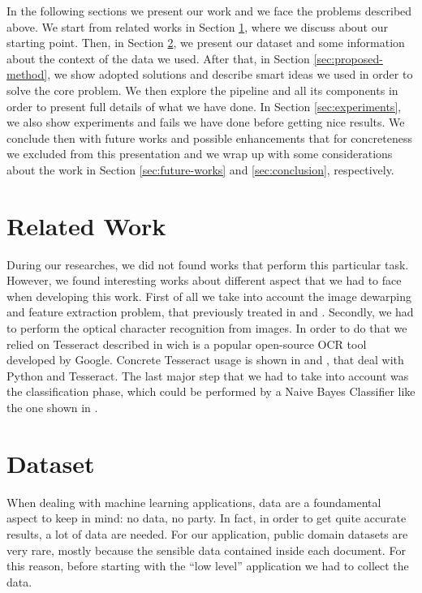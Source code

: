 \documentclass[10pt,twocolumn,letterpaper]{article}
\begin{document}
In the following sections we present our work and we face the problems
described above. We start from related works in Section
\ref{sec:related-work}, where we discuss about our starting
point. Then, in Section \ref{sec:dataset}, we present our dataset and
some information about the context of the data we used. After that, in
Section \ref{sec:proposed-method}, we show adopted solutions and
describe smart ideas we used in order to solve the core problem. We
then explore the pipeline and all its components in order to present
full details of what we have done. In Section \ref{sec:experiments},
we also show experiments and fails we have done before getting nice
results. We conclude then with future works and possible enhancements
that for concreteness we excluded from this presentation and we wrap
up with some considerations about the work in Section
\ref{sec:future-works} and \ref{sec:conclusion}, respectively.

\section{Related Work}
\label{sec:related-work}

During our researches, we did not found works that perform this
particular task. However, we found interesting works about different
aspect that we had to face when developing this work.  First of all we
take into account the image dewarping and feature extraction problem,
that previously treated in \cite{Korber18} and \cite{AbbasHussain17}.
Secondly, we had to perform the optical character recognition from
images. In order to do that we relied on Tesseract described in
\cite{Smith07} wich is a popular open-source OCR tool developed by
Google. Concrete Tesseract usage is shown in \cite{Benabderrazak20}
and \cite{ZelicSable20}, that deal with Python and Tesseract. The
last major step that we had to take into account was the
classification phase, which could be performed by a Naive Bayes
Classifier like the one shown in \cite{ScikitTextDataTutorial}.

\section{Dataset}
\label{sec:dataset}

When dealing with machine learning applications, data are a
foundamental aspect to keep in mind: no data, no party. In fact, in
order to get quite accurate results, a lot of data are needed. For our
application, public domain datasets are very rare, mostly because the
sensible data contained inside each document. For this reason, before
starting with the ``low level'' application we had to collect the
data.
\end{document}
